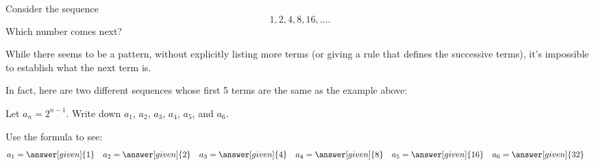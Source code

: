 \documentclass{ximera}
\begin{document}
\begin{question}
  Consider the sequence
  \[
  1, 2, 4, 8, 16, \dots.
  \]
  Which number comes next?
  \begin{multipleChoice}
  \end{multipleChoice}

While there seems to be a pattern, without explicitly listing more terms (or giving a rule that defines the successive terms), it's impossible to establish what the next term is. 

\end{question}

In fact, here are two different sequences whose first 5 terms are the same as the example above:

\begin{example}
  Let $a_n = 2^{n-1}$.  Write down $a_1$, $a_2$, $a_3$, $a_4$, $a_5$, and
  $a_6$.
  \begin{explanation}
    Use the formula to see:
    \begin{align*}
      a_1 &= \answer[given]{1} & a_2 &= \answer[given]{2} & 
      a_3 &= \answer[given]{4} & 
      a_4 &= \answer[given]{8} & 
      a_5 &= \answer[given]{16} & 
      a_6 &= \answer[given]{32}
    \end{align*}
  \end{explanation}
\end{example}
\end{document}
